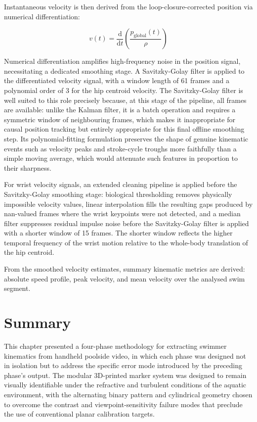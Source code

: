 Instantaneous velocity is then derived from the loop-closure-corrected position via numerical
differentiation:

\begin{equation}
    v(t) = \frac{\mathrm{d}}{\mathrm{d}t}\left(\frac{p_{\text{global}}(t)}{\rho}\right)
\end{equation}

Numerical differentiation amplifies high-frequency noise in the position signal, necessitating
a dedicated smoothing stage. A Savitzky-Golay filter is applied to the differentiated velocity
signal, with a window length of 61 frames and a polynomial order of 3 for the hip centroid
velocity. The Savitzky-Golay filter is well suited to this role precisely because, at this
stage of the pipeline, all frames are available: unlike the Kalman filter, it is a batch
operation and requires a symmetric window of neighbouring frames, which makes it inappropriate
for causal position tracking but entirely appropriate for this final offline smoothing step.
Its polynomial-fitting formulation preserves the shape of genuine kinematic events such as
velocity peaks and stroke-cycle troughs more faithfully than a simple moving average, which
would attenuate such features in proportion to their sharpness.

For wrist velocity signals, an extended cleaning pipeline is applied before the Savitzky-Golay
smoothing stage: biological thresholding removes physically impossible velocity values,
linear interpolation fills the resulting gaps produced by \gls{nan}-valued frames where the wrist
keypoints were not detected, and a median filter suppresses residual impulse noise before the
Savitzky-Golay filter is applied with a shorter window of 15 frames. The shorter window
reflects the higher temporal frequency of the wrist motion relative to the whole-body
translation of the hip centroid.

From the smoothed velocity estimates, summary kinematic metrics are derived: absolute speed
profile, peak velocity, and mean velocity over the analysed swim segment.

\section{Summary}\label{sec:methodology-summary}

This chapter presented a four-phase methodology for extracting swimmer kinematics from
handheld poolside video, in which each phase was designed not in isolation but to address the
specific error mode introduced by the preceding phase's output. The modular 3D-printed marker
system was designed to remain visually identifiable under the refractive and turbulent
conditions of the aquatic environment, with the alternating binary pattern and cylindrical
geometry chosen to overcome the contrast and viewpoint-sensitivity failure modes that preclude
the use of conventional planar calibration targets.


